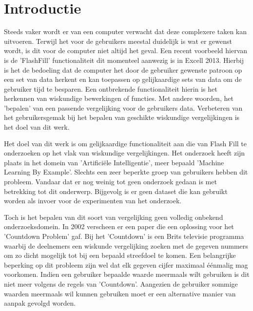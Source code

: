 \documentclass[Main.tex]{subfiles}
\begin{document}
\section{Introductie}
Steeds vaker wordt er van een computer verwacht dat deze complexere taken kan uitvoeren. Terwijl het voor de gebruikers meestal duidelijk is wat er gewenst wordt, is dit voor de computer niet altijd het geval. Een recent voorbeeld hiervan is de 'FlashFill' functionaliteit dit momenteel aanwezig is in Excell 2013.\cite{count2002} Hierbij is het de bedoeling dat de computer het door de gebruiker gewenste patroon op een set van data herkent en kan toepassen op gelijkaardige sets van data om de gebruiker tijd te besparen. Een ontbrekende functionaliteit hierin is het herkennen van wiskundige bewerkingen of functies. Met andere woorden, het 'bepalen' van een passende vergelijking voor de gebruikers data. Verbeteren van het gebruikersgemak bij het bepalen van geschikte wiskundige vergelijkingen is het doel van dit werk. \par  %

Het doel van dit werk is om gelijkaardige functionaliteit aan die van Flash Fill te onderzoeken op het vlak van wiskundige vergelijkingen. Het onderzoek heeft zijn plaats in het domein van 'Artifici\"ele Intelligentie', meer bepaald 'Machine Learning By Example'. Slechts een zeer beperkte groep van gebruikers hebben dit probleem. Vandaar dat er nog weinig tot geen onderzoek gedaan is met betrekking tot dit onderwerp. Bijgevolg is er geen dataset die kan gebruikt worden als invoer voor de experimenten van het onderzoek.  \par

Toch is het bepalen van dit soort van vergelijking geen volledig onbekend onderzoeksdomein. In 2002 verscheen er een paper die een oplossing voor het 'Countdown Problem' gaf. Bij het 'Countdown' is een Brits televisie programma waarbij de deelnemers een wiskunde vergelijking zoeken met de gegeven nummers om zo dicht mogelijk tot bij een bepaald streefdoel te komen. Een belangrijke beperking op dit probleem zijn wel dat elk gegeven cijfer maximaal \'e\'enmalig mag voorkomen. Indien een gebruiker bepaalde waarde meermaals wilt gebruiken is dit niet meer volgens de regels van 'Countdown'. Aangezien de gebruiker sommige waarden meermaals wil kunnen gebruiken moet er een alternative manier van aanpak gevolgd worden.
\end{document}
